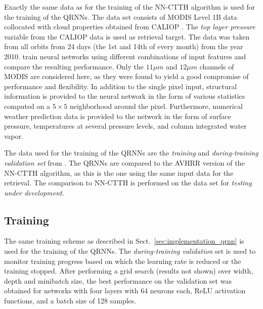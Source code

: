 \documentclass[journal abbreviation, manuscript]{copernicus}
\begin{document}
Exactly the same data as for the training of the NN-CTTH algorithm is used for
the training of the QRNNs. The data set consists of MODIS Level 1B data
\citep{myd021km, myd03} collocated with cloud properties obtained from CALIOP
\citep{calipso}. The \textit{top layer pressure} variable from the CALIOP data
is used as retrieval target. The data was taken from all orbits from 24 days
(the 1st and 14th of every month) from the year 2010. \citet{hakansson} train
neural networks using different combinations of input features and compare the
resulting performance. Only the $11 \unit{\mu m}$ and $12\unit{\mu m}$ channels
of MODIS are considered here, as they were found to yield a good compromise of
performance and flexibility. In addition to the single pixel input, structural
information is provided to the neural network in the form of various statistics
computed on a $5 \times 5$ neighborhood around the pixel. Furthermore, numerical
weather prediction data is provided to the network in the form of surface
pressure, temperatures at several pressure levels, and column integrated water
vapor.

The data used for the training of the QRNNs are the \textit{training} and
\textit{during-training validation set} from \cite{hakansson}. The QRNNs are
compared to the AVHRR version of the NN-CTTH algorithm, as this is the one
using the same input data for the retrieval. The comparison to NN-CTTH is
performed on the data set for \textit{testing under development}.

\subsection{Training}

The same training scheme as described in Sect.~\ref{sec:implementation_qrnn}
is used for the training of the QRNNs. The \textit{during-training validation} set is used
to monitor training progress based on which the learning rate is reduced or the
training stopped. After performing a grid search (results not shown) over width,
depth and minibatch size, the best performance on the validation set was
obtained for networks with four layers with 64 neurons each, ReLU activation functions,
 and a batch size of 128 samples.
\end{document}
